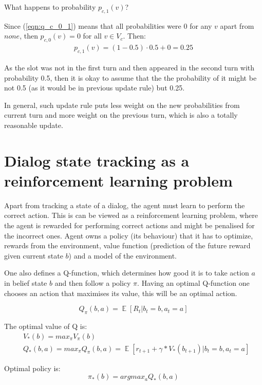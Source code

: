 \documentclass[12pt,titlepage,a4paper]{article}
\DeclareMathOperator*{\E}{\mathbb{E}}
\begin{document}
What happens to probability $p_{c,1}(v)$?

Since (\ref{eqn:q_c_0_1}) means that all probabilities were 0 for any $v$ apart from $none$, then $p_{c,0}(v) = 0$ for all $v \in V_c$. Then: 
\begin{align*}
    p_{c,1}(v) = (1 - 0.5) \cdot 0.5 + 0 = 0.25
\end{align*}

As the slot was not in the first turn and then appeared in the second turn with probability 0.5, then it is okay to assume that the the probability of it might be not 0.5 (as it would be in previous update rule) but 0.25. 

In general, such update rule puts less weight on the new probabilities from current turn and more weight on the previous turn, which is also a totally reasonable update. 

\newpage

\section{Dialog state tracking as a reinforcement learning problem}
Apart from tracking a state of a dialog, the agent must learn to perform the correct action. This is can be viewed as a reinforcement learning problem, where the agent is rewarded for performing correct actions and might be penalised for the incorrect ones. Agent owns a policy (its behaviour) that it has to optimize, rewards from the environment, value function (prediction of the future reward given current state $b$) and a model of the environment.

One also defines a Q-function, which determines how good it is to take action $a$ in belief state $b$ and then follow a policy $\pi$. Having an optimal Q-function one chooses an action that maximises its value, this will be an optimal action.


\begin{equation}
    Q_{\pi}(b, a) = \E[R_t| b_t = b, a_t = a]
\end{equation}

The optimal value of Q is:
\begin{align}
    &V_{*}(b) = max_{\pi}V_{\pi}(b) \\
    &Q_{*}(b, a) = max_{\pi}Q_{\pi}(b, a) = \E[r_{t+1} + \gamma * V_{*}(b_{t+1})| b_t = b, a_t = a]
\end{align}

Optimal policy is: 
\begin{equation}
    \pi_{*}(b) = argmax_{a} Q_{*}(b, a)
\end{equation}
\end{document}
